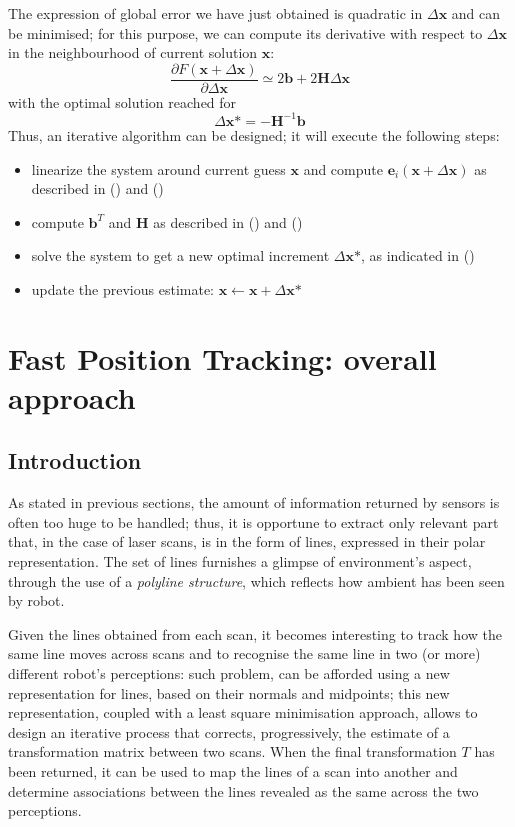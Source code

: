 \documentclass[a4paper, onecolumn]{report}
\begin{document}
The expression of global error we have just obtained is quadratic in $\Delta\textbf{x}$ and can be minimised; for this purpose, we can compute its derivative with respect to $\Delta\textbf{x}$ in the neighbourhood of current solution $\textbf{x}$:
\begin{equation}
\frac{\partial F(\textbf{x}+\Delta\textbf{x})}{\partial\Delta\textbf{x}} \simeq 2\textbf{b} + 2\textbf{H}\Delta\textbf{x}
\end{equation}
with the optimal solution reached for 
\begin{equation}
\Delta\textbf{x*} = -\textbf{H}^{-1}\textbf{b}
\end{equation}
Thus, an iterative algorithm can be designed; it will execute the following steps:
\begin{itemize}
	\item{linearize the system around current guess $\textbf{x}$ and compute $\textbf{e}_i(\textbf{x} + \Delta\textbf{x})$ as described in () and ()}
	\item{compute $\textbf{b}^T$ and $\textbf{H}$ as described in () and ()}
	\item{solve the system to get a new optimal increment $\Delta\textbf{x*}$, as indicated in ()}
	\item{update the previous estimate: $\textbf{x} \leftarrow \textbf{x} + \Delta\textbf{x*}$}
\end{itemize}


\chapter{ Fast Position Tracking: overall approach}

\section{Introduction}
As stated in previous sections, the amount of information returned by sensors is often too huge to be handled; thus, it is opportune to extract only relevant part that, in the case of laser scans, is in the form of lines, expressed in their polar representation. The set of lines furnishes a glimpse of environment's aspect, through the use of a \emph{polyline structure}, which reflects how ambient has been seen by robot.

Given the lines obtained from each scan, it becomes interesting to track how the same line moves across scans and to recognise the same line in two (or more) different robot's perceptions: such problem, can be afforded using a new representation for lines, based on their normals and midpoints; this new representation, coupled with a least square minimisation approach, allows to design an iterative process that corrects, progressively, the estimate of a transformation matrix between two scans. When the final transformation $T$ has been returned, it can be used to map the lines of a scan into another and determine associations between the lines revealed as the same across the two perceptions.
\end{document}
